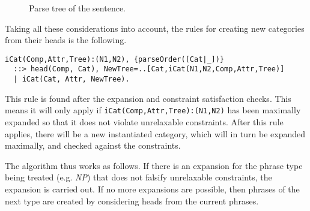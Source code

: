 \documentclass{llncs}
\newcommand{\PN}{\textit{PN}\xspace}
\newcommand{\NP}{\textit{NP}\xspace}
\newcommand{\VP}{\textit{VP}\xspace}
\newcommand{\Se}{\textit{S}\xspace}
\newcommand{\N}{\textit{N}\xspace}
\newcommand{\V}{\textit{V}\xspace}
\newcommand{\D}{\textit{D}\xspace}
\begin{document}
\begin{itemize}
\begin{figure}[H]
\begin{center}
  \caption{Parse tree of the sentence.}
  \label{fig:tree}
  \end{center}
\end{figure}
\end{itemize}

Taking all these considerations into account, the rules for creating new categories from their heads is the following.
\begin{verbatim}
iCat(Comp,Attr,Tree):(N1,N2), {parseOrder([Cat|_])}
  ::> head(Comp, Cat), NewTree=..[Cat,iCat(N1,N2,Comp,Attr,Tree)]
  | iCat(Cat, Attr, NewTree).
\end{verbatim}

This rule is found after the expansion and constraint satisfaction checks. This means it will only apply if \texttt{iCat(Comp,Attr,Tree):(N1,N2)} has been maximally expanded so that it does not violate unrelaxable constraints. After this rule applies, there will be a new instantiated category, which will in turn be expanded maximally, and checked against the constraints.




The algorithm thus works as follows. If there is an expansion for the phrase type being treated (e.g. \NP) that does not falsify unrelaxable constraints, the expansion is carried out. If no more expansions are possible, then phrases of the next type are created by considering heads from the current phrases.
\end{document}
